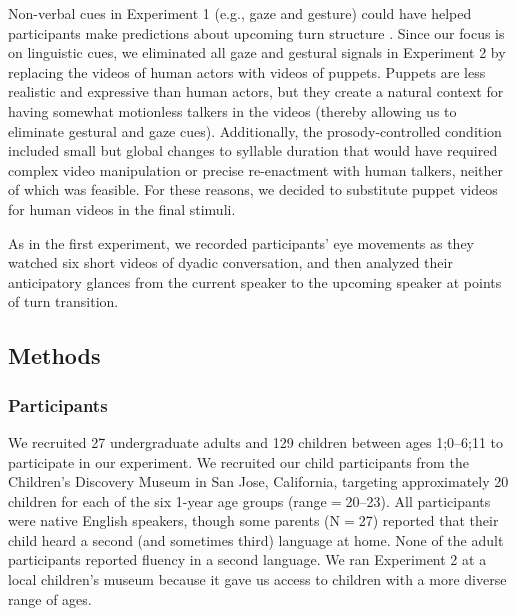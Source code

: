 \documentclass[authoryear, 12pt]{elsarticle}
\begin{document}
Non-verbal cues in Experiment 1 (e.g., gaze and gesture) could have helped participants make predictions about upcoming turn structure  \citep{rossano2009, stivers2010}. Since our focus is on linguistic cues, we eliminated all gaze and gestural signals in Experiment 2 by replacing the videos of human actors with videos of puppets. Puppets are less realistic and expressive than human actors, but they create a natural context for having somewhat motionless talkers in the videos (thereby allowing us to eliminate gestural and gaze cues). Additionally, the prosody-controlled condition included small but global changes to syllable duration that would have required complex video manipulation or precise re-enactment with human talkers, neither of which was feasible. For these reasons, we decided to substitute puppet videos for human videos in the final stimuli. 

As in the first experiment, we recorded participants' eye movements as they watched six short videos of dyadic conversation, and then analyzed their anticipatory glances from the current speaker to the upcoming speaker at points of turn transition.

\subsection{Methods}
\label{sec:methods2}

\subsubsection{Participants}
We recruited 27 undergraduate adults and 129 children between ages 1;0--6;11 to participate in our experiment. We recruited our child participants from the Children's Discovery Museum in San Jose, California, targeting approximately 20 children for each of the six 1-year age groups (range$=$20--23). All participants were native English speakers, though some parents (N$=$27) reported that their child heard a second (and sometimes third) language at home. None of the adult participants reported fluency in a second language. We ran Experiment 2 at a local children's museum because it gave us access to children with a more diverse range of ages.
\end{document}

